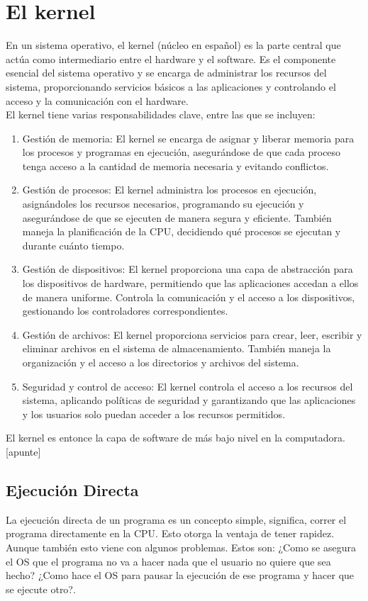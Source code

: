 \documentclass[../main.tex]{subfiles}
\begin{document}
\section{El kernel}
En un sistema operativo, el kernel (núcleo en español) es la parte central que actúa como intermediario entre el hardware y el software. Es el componente esencial del sistema operativo y se encarga de administrar los recursos del sistema, proporcionando servicios básicos a las aplicaciones y controlando el acceso y la comunicación con el hardware.\\

El kernel tiene varias responsabilidades clave, entre las que se incluyen:
\begin{enumerate}
    \item Gestión de memoria: El kernel se encarga de asignar y liberar memoria para los procesos y programas en ejecución, asegurándose de que cada proceso tenga acceso a la cantidad de memoria necesaria y evitando conflictos.
    \item Gestión de procesos: El kernel administra los procesos en ejecución, asignándoles los recursos necesarios, programando su ejecución y asegurándose de que se ejecuten de manera segura y eficiente. También maneja la planificación de la CPU, decidiendo qué procesos se ejecutan y durante cuánto tiempo.
    \item Gestión de dispositivos: El kernel proporciona una capa de abstracción para los dispositivos de hardware, permitiendo que las aplicaciones accedan a ellos de manera uniforme. Controla la comunicación y el acceso a los dispositivos, gestionando los controladores correspondientes.
    \item Gestión de archivos: El kernel proporciona servicios para crear, leer, escribir y eliminar archivos en el sistema de almacenamiento. También maneja la organización y el acceso a los directorios y archivos del sistema.
    \item Seguridad y control de acceso: El kernel controla el acceso a los recursos del sistema, aplicando políticas de seguridad y garantizando que las aplicaciones y los usuarios solo puedan acceder a los recursos permitidos.
\end{enumerate}

El kernel es entonce la capa de software de más bajo nivel en la computadora.[apunte]

    \subsection*{Ejecución Directa}
        La ejecución directa de un programa es un concepto simple, significa, correr el programa directamente en la CPU. Esto otorga la ventaja de tener rapidez. Aunque también esto viene con algunos problemas. Estos son: ¿Como se asegura el OS que el programa no va a hacer nada que el usuario no quiere que sea hecho? ¿Como hace el OS para pausar la ejecución de ese programa y hacer que se ejecute otro?.
\end{document}
